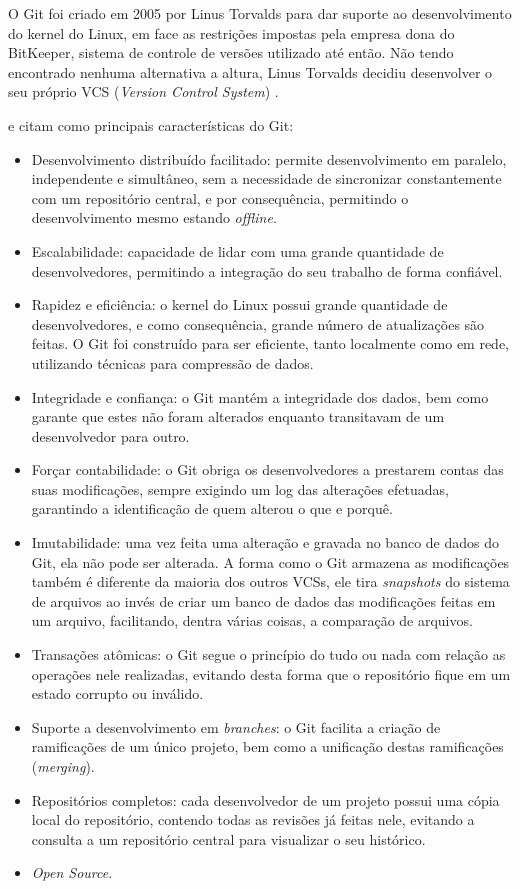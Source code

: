 \documentclass[diss]{template/setrem}
\begin{document}
O Git foi criado em 2005 por Linus Torvalds para dar suporte ao desenvolvimento do kernel do Linux, em face as restrições impostas pela empresa dona do BitKeeper, sistema de controle de versões utilizado até então. Não tendo encontrado nenhuma alternativa a altura, Linus Torvalds decidiu desenvolver o seu próprio VCS (\emph{Version Control System}) \citep{Loeliger2009}.

\citet{Loeliger2009} e \citet{Chacon2009} citam como principais características do Git:
\begin{itemize}
	\item Desenvolvimento distribuído facilitado: permite desenvolvimento em paralelo, independente e simultâneo, sem a necessidade de sincronizar constantemente com um repositório central, e por consequência, permitindo o desenvolvimento mesmo estando \emph{offline}.
	\item Escalabilidade: capacidade de lidar com uma grande quantidade de desenvolvedores, permitindo a integração do seu trabalho de forma confiável.
	\item Rapidez e eficiência: o kernel do Linux possui grande quantidade de desenvolvedores, e como consequência, grande número de atualizações são feitas. O Git foi construído para ser eficiente, tanto localmente como em rede, utilizando técnicas para compressão de dados.
	\item Integridade e confiança: o Git mantém a integridade dos dados, bem como garante que estes não foram alterados enquanto transitavam de um desenvolvedor para outro.
	\item Forçar contabilidade: o Git obriga os desenvolvedores a prestarem contas das suas modificações, sempre exigindo um log das alterações efetuadas, garantindo a identificação de quem alterou o que e porquê.
	\item Imutabilidade: uma vez feita uma alteração e gravada no banco de dados do Git, ela não pode ser alterada. A forma como o Git armazena as modificações também é diferente da maioria dos outros VCSs, ele tira \emph{snapshots} do sistema de arquivos ao invés de criar um banco de dados das modificações feitas em um arquivo, facilitando, dentra várias coisas, a comparação de arquivos.
	\item Transações atômicas: o Git segue o princípio do tudo ou nada com relação as operações nele realizadas, evitando desta forma que o repositório fique em um estado corrupto ou inválido.
	\item Suporte a desenvolvimento em \emph{branches}: o Git facilita a criação de ramificações de um único projeto, bem como a unificação destas ramificações (\emph{merging}).
	\item Repositórios completos: cada desenvolvedor de um projeto possui uma cópia local do repositório, contendo todas as revisões já feitas nele, evitando a consulta a um repositório central para visualizar o seu histórico.
	\item \emph{Open Source}.
\end{itemize}
\end{document}
